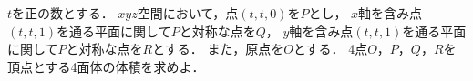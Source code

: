 \documentclass[../../main.tex]{subfiles}
\begin{document}
$t$を正の数とする．
$xyz$空間において，点$(t,t,0)$を$P$とし，
$x$軸を含み点$(t,t,1)$を通る平面に関して$P$と対称な点を$Q$，
$y$軸を含み点$(t,t,1)$を通る平面に関して$P$と対称な点を$R$とする．
また，原点を$O$とする．
4点$O$，$P$，$Q$，$R$を頂点とする4面体の体積を求めよ．
\end{document}
